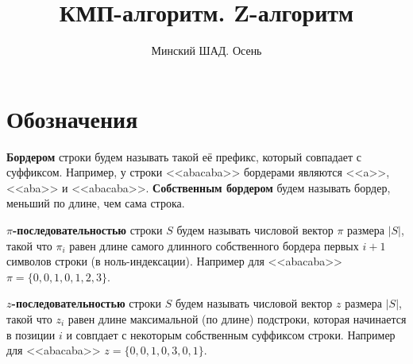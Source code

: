 \documentclass[addpoints]{exam}
\title{КМП-алгоритм. Z-алгоритм}
\author{Минский ШАД. Осень}
\begin{document}
\maketitle

\section{Обозначения}

\textbf{Бордером} строки будем называть такой её префикс, который совпадает с суффиксом. Например, у строки <<abacaba>> бордерами являются <<a>>, <<aba>> и <<abacaba>>. \textbf{Собственным бордером} будем называть бордер, меньший по длине, чем сама строка. 

\label{piseq} \textbf{$\pi$-последовательностью} строки $S$ будем называть числовой вектор $\pi$ размера $|S|$, такой что $\pi_i$ равен длине самого длинного собственного бордера первых $i+1$ символов строки (в ноль-индексации). Например для <<abacaba>> $\pi=\{0,0,1,0,1,2,3\}$. 

\label{zseq} \textbf{$z$-последовательностью} строки $S$ будем называть числовой вектор $z$ размера $|S|$, такой что $z_i$ равен длине максимальной (по длине) подстроки, которая начинается в позиции $i$ и совпдает с некоторым собственным суффиксом строки. Например для <<abacaba>> $z=\{0,0,1,0,3,0,1\}$. 
\end{document}
